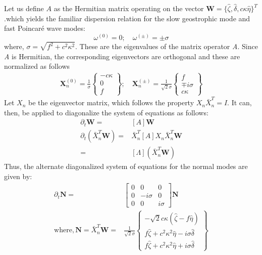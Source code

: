 \documentclass[a4paper,12pt]{paper}
\begin{document}
Let us define $A$ as the Hermitian matrix operating on the vector 
$\mathbf{W} = \{\hat{\zeta}, \hat{\delta} ,c\kappa \hat{\eta} \}^T $.which 
yields the 
familiar dispersion relation 
for the slow geostrophic mode 
and fast Poincar\'e wave modes:
\begin{equation}
 \omega^{(0)} = 0;\quad \omega^{(\pm)}=\pm \sigma
\end{equation}
where, $\sigma = \sqrt{f^2 + c^2\kappa^2 }$. These are the eigenvalues of 
the matrix operator \emph{A}. Since \emph{A} is Hermitian, the corresponding 
eigenvectors are orthogonal and these are normalized as follows
\begin{align}
  \mathbf X^{(0)}_n = 
    \frac{1}{\sigma}
    \begin{Bmatrix}
       -c\kappa \\ 0 \\ f
     \end{Bmatrix}; \quad
  \mathbf X^{(\pm)}_n = 
    \frac{1}{\sqrt{2} \sigma}
    \begin{Bmatrix}
       f \\ \mp i\sigma \\ c\kappa
     \end{Bmatrix}
\end{align}
Let $X_n$ be the eigenvector matrix, which follows the 
property $X_n \bar{X}_n^{T}=I$. It can, then, be applied to diagonalize the 
system of 
equations as follows:
\begin{align}
 \partial_t \mathbf{W} =& [A] \mathbf{W}\\
 \partial_t (\bar{X}_n^T \mathbf{W}) =& \bar{X}_n^T[A]X_n 
\bar{X}_n^T\mathbf{W}\\
			    =& [\Lambda] (\bar{X}_n^T\mathbf{W})
\end{align}
Thus, the alternate diagonalized system of equations for the normal modes are 
given by:
\begin{align}
 \partial_t
\mathbf{N}
  = &
  \begin{bmatrix}
     0 & 0 & 0 \\
     0 & -i\sigma & 0 \\
     0 & 0 & i\sigma 
  \end{bmatrix}
  \mathbf{N}\\
\text{where},
   \mathbf{N} = \bar{X}_n^T \mathbf{W}
   = &\frac{1}{\sqrt{2}\sigma}
   \begin{Bmatrix}
       -\sqrt{2}c\kappa(\hat{\zeta} -f \hat{\eta}) \\ 
        f\hat{\zeta} + c^2\kappa^2\hat{\eta} - i\sigma\hat{\delta} \\
       f\hat{\zeta} + c^2\kappa^2\hat{\eta} + i\sigma\hat{\delta}
   \end{Bmatrix}
\end{align}
\end{document}
